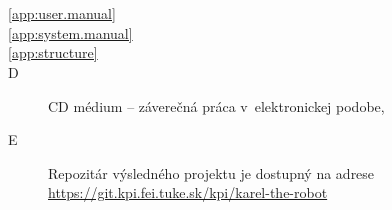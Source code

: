 
\chapter*{\appendixlistname}

\begin{description}

   \item[\autoref{app:user.manual}] 
   \item[\autoref{app:system.manual}] 
   \item[\autoref{app:structure}] 
   \item[\appendixname{} D] CD médium -- záverečná práca v~elektronickej podobe,
   \item[\appendixname{} E] Repozitár výsledného projektu je dostupný na adrese\\ \url{https://git.kpi.fei.tuke.sk/kpi/karel-the-robot}
   \end{description}
